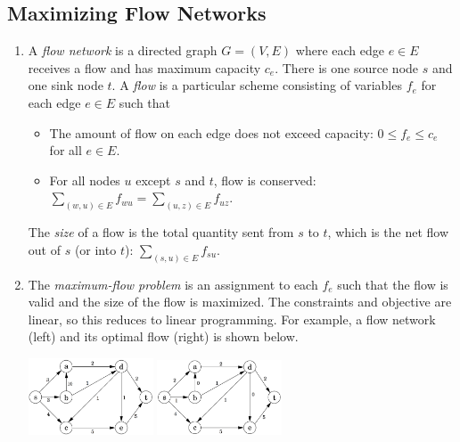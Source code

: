 \documentclass[10pt]{article}
\begin{document}
\begin{multicols}{2}
\begin{addmargin}[0.8em]{0.5em}
    \subsection{Maximizing Flow Networks}
    \vspace{-0.2cm}
    \begin{enumerate}[label=(\alph*)]
        \item 
        A \textit{flow network} is a directed graph $G=(V,E)$ where each edge $e \in E$ receives a flow and has maximum capacity $c_e$. There is one source node $s$ and one sink node $t$. A \textit{flow} is a particular scheme consisting of variables $f_e$ for each edge $e \in E$ such that 
        \begin{itemize}
        \item The amount of flow on each edge does not exceed capacity: $0 \leq f_e \leq c_e$ for all $e \in E$.
        \item For all nodes $u$ except $s$ and $t$, flow is conserved: $\sum_{(w,u) \in E} f_{wu} = \sum_{(u,z) \in E} f_{uz}$.
        \end{itemize}
        The \textit{size} of a flow is the total quantity sent from $s$ to $t$, which is the net flow out of $s$ (or into $t$): $\sum_{(s,u) \in E} f_{su}$.
        
        \item The \textit{maximum-flow problem} is an assignment to each $f_e$ such that the flow is valid and the size of the flow is maximized. The constraints and objective are linear, so this reduces to linear programming. For example, a flow network (left) and its optimal flow (right) is shown below.
        \begin{center}
        \includegraphics[width=3.7cm]{fn.png} \hspace{0.3cm}
        \includegraphics[width=3.7cm]{maxflow.png}
        \end{center}     
        

\end{enumerate}
\end{addmargin}
\end{multicols}
\end{document}
